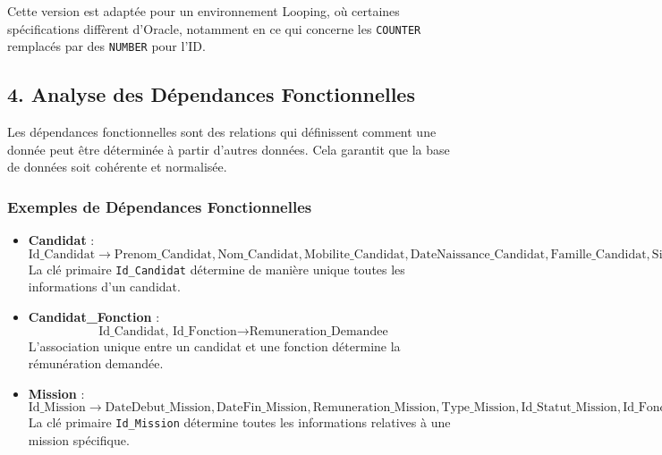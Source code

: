 \documentclass[a4paper,12pt]{article}
\begin{document}
\noindent
Cette version est adaptée pour un environnement Looping, où certaines spécifications diffèrent d'Oracle, notamment en ce qui concerne les \texttt{COUNTER} remplacés par des \texttt{NUMBER} pour l'ID.

\subsection*{4. Analyse des Dépendances Fonctionnelles}

Les dépendances fonctionnelles sont des relations qui définissent comment une donnée peut être déterminée à partir d'autres données. Cela garantit que la base de données soit cohérente et normalisée.

\subsubsection*{Exemples de Dépendances Fonctionnelles}

\begin{itemize}
    \item \textbf{Candidat} : 
    \begin{equation*}
        \text{Id\_Candidat} \rightarrow \text{Prenom\_Candidat}, \text{Nom\_Candidat}, \text{Mobilite\_Candidat}, \text{DateNaissance\_Candidat}, \text{Famille\_Candidat}, \text{Situation\_Prof\_Candidat}, \text{Id\_Source\_Candidat}
    \end{equation*}
    La clé primaire \texttt{Id\_Candidat} détermine de manière unique toutes les informations d'un candidat.
    
    \item \textbf{Candidat\_Fonction} : 
    \begin{equation*}
        \text{Id\_Candidat, Id\_Fonction} \rightarrow \text{Remuneration\_Demandee}
    \end{equation*}
    L'association unique entre un candidat et une fonction détermine la rémunération demandée.
    
    \item \textbf{Mission} : 
    \begin{equation*}
        \text{Id\_Mission} \rightarrow \text{DateDebut\_Mission}, \text{DateFin\_Mission}, \text{Remuneration\_Mission}, \text{Type\_Mission}, \text{Id\_Statut\_Mission}, \text{Id\_Fonction}, \text{Id\_Entreprise}
    \end{equation*}
    La clé primaire \texttt{Id\_Mission} détermine toutes les informations relatives à une mission spécifique.
\end{itemize}
\end{document}
